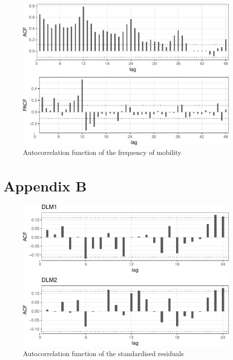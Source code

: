 \documentclass[12pt, a4paper]{article}
\begin{document}
\begin{figure}[H]
  \caption{\label{fig:autocorr-plot}Autocorrelation function of the frequency
of mobility}
\centering
\includegraphics[scale = 0.8]{../figs/freq--autocorr-plot-1.pdf}
\end{figure}

\section{Appendix B}\label{appendix-b}

\begin{figure}[H]
  \caption{\label{fig:residual-autocorr}Autocorrelation function of the
standardised residuals}
\centering
\includegraphics[scale = 0.8]{../figs/freq--residual-autocorr-1.pdf}
\end{figure}
\end{document}
